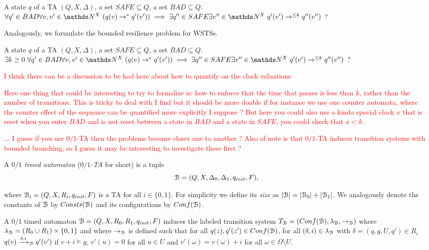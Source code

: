 {A state $q$ of a TA $(Q, X, \Delta)$, a set $SAFE \subseteq Q$, a set $BAD \subseteq Q$.}
{$\forall q' \in BAD \forall v,v' \in \N^X ~ (q(v) \rightarrow^* q'(v')) \implies \exists q'' \in SAFE \exists v'' \in \N^X ~ q'(v') \rightarrow^{\leq k} q''(v'')$ ?\newline}


Analogously, we formulate the bounded resilience problem for WSTSs.


{A state $q$ of a TA $(Q, X, \Delta)$, a set $SAFE \subseteq Q$, a set $BAD \subseteq Q$.}
{$\exists k \geq 0 ~ \forall q' \in BAD \forall v,v' \in \N^X ~ (q(v) \rightarrow^* q'(v')) \implies \exists q'' \in SAFE \exists v'' \in \N^X ~ q'(v') \rightarrow^{\leq k} q''(v'')$ ?\newline}

\textcolor{red}{I think there can be a discussion to be had here about how to quantify on the clock valuations}

\textcolor{red}{Here one thing that could be interesting to try to formalize is: how to enforce that the time that passes is less than $k$, rather than the number of transitions. This is tricky to deal with I find but it should be more doable if for instance we use one counter automata, where the counter effect of the sequence can be quantified more explicitly I suppose ?
But here you could also use a kinda special clock $x$ that is reset when you enter $BAD$ and is not reset between a state in $BAD$ and a state in $SAFE$, you could check that $x < k$.}

\textcolor{red}{... I guess if you use $0/1$-TA then the problems become closer one to another ? Also of note is that $0/1$-TA induces transition systems with bounded branching, so I guess it may be interesting to investigate these first ?}

A {\em $0/1$ timed automaton } ({\em $0/1$-TA} for short) is a tuple
$$\mathcal{B}=(Q,X, \Delta_0, \Delta_1, q_{init}, F),$$
\par\noindent\ignorespacesafterend
 where
$\mathcal{B}_i=(Q,X, R_i, q_{init}, F)$ is a TA for all $i \in \{0,1\}$.
For simplicity we define its {\em size}
as $|\mathcal{B}|=|\mathcal{B}_0|+|\mathcal{B}_1|$.
We analogously denote the constants of $\mathcal{B}$ 
by $\Const(\B)$ and its configurations by  $\Conf(\B)$.

\begin{samepage}
A $0/1$ timed automaton $\mathcal{B}=(Q,X,R_0,R_1,q_{init},F)$ 
induces the labeled transition system 
$T_{\B} = (\Conf(\B), \lambda_{\B}, \rightarrow_{\B}) $
where $ \lambda_{\mathcal{B}} = (R_0 \cup R_1) \times \{ 0,1\}$
	and where $ \rightarrow_{\mathcal{B}}$
	is defined such that
	for all $q(z), q'(z') \in \Conf(\B)$, 
	for all $(\delta,i) \in \lambda_{\mathcal{B}}$
	with $\delta  = (q,g,U,q')\in R_i$
	$q(v)\xrightarrow{\delta,i}_{\mathcal{B}} q'(v')$ if
	$v+i \models g$, 
	$v'(u)=0$ for all $u \in U$ and $v'(\omega)=v(\omega)+ i$ for all $\omega \in \Omega
	\setminus U$. 
\end{samepage}



